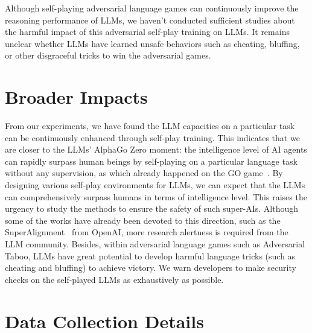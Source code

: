 \documentclass{article}
\theoremstyle{plain}
\theoremstyle{definition}
\theoremstyle{remark}
\begin{document}
Although self-playing adversarial language games can continuously improve the reasoning performance of LLMs, we haven't conducted sufficient studies about the harmful impact of this adversarial self-play training on LLMs. It remains unclear whether LLMs have learned unsafe behaviors such as cheating, bluffing, or other disgraceful tricks to win the adversarial games.  





\vspace{-2mm}
\section{Broader Impacts} \label{sec:broader_impacts}
\vspace{-2mm}
From our experiments, we have found the LLM capacities on a particular task can be continuously enhanced through self-play training. This indicates that we are closer to the LLMs' AlphaGo Zero moment: the intelligence level of AI agents can rapidly surpass human beings by self-playing on a particular language task without any supervision, as which already happened on the GO game~\citep{silver2017mastering}. By designing various self-play environments for LLMs, we can expect that the LLMs can comprehensively surpass humans in terms of intelligence level. This raises the urgency to study the methods to ensure the safety of such super-AIs. Although some of the works have already been devoted to this direction, such as the SuperAlignment~\citep{burns2023weak} from OpenAI, more research alertness is required from the LLM community.
%
Besides, within adversarial language games such as Adversarial Taboo, LLMs have great potential to develop harmful language tricks (such as cheating and bluffing) to achieve victory. We warn developers to make security checks on the self-played LLMs as exhaustively as possible. 

\vspace{-2mm}



\clearpage
\appendix

\section{Data Collection Details}\label{sec:data-collection-appendix}
\vspace{-2mm}
\end{document}
